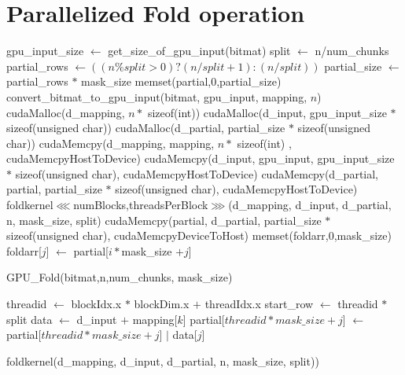 \documentclass{article}
\begin{document}
\section*{Parallelized Fold operation}
\begin{algorithm}[H]
      \begin{algorithmic}[1]
      \STATE gpu\_input\_size $\gets$ get\_size\_of\_gpu\_input(bitmat)
      \STATE split $\gets$ n/num\_chunks
      \STATE partial\_rows $\gets ((n\%split > 0) ? (n/split + 1) : (n/split))$
      \STATE partial\_size $\gets$ partial\_rows $*$ mask\_size
      \STATE memset(partial,$0$,partial\_size)
      \STATE convert\_bitmat\_to\_gpu\_input(bitmat, gpu\_input, mapping, $n$)
      \STATE cudaMalloc(d\_mapping, $n *$ sizeof(int))
      \STATE cudaMalloc(d\_input, gpu\_input\_size $*$ sizeof(unsigned char))
      \STATE cudaMalloc(d\_partial, partial\_size $*$ sizeof(unsigned char))
      \STATE cudaMemcpy(d\_mapping, mapping, $n *$ sizeof(int) , cudaMemcpyHostToDevice)
      \STATE cudaMemcpy(d\_input, gpu\_input, gpu\_input\_size $*$ sizeof(unsigned char), cudaMemcpyHostToDevice)
      \STATE cudaMemcpy(d\_partial, partial, partial\_size $*$ sizeof(unsigned char), cudaMemcpyHostToDevice)
      \STATE foldkernel$\lll$numBlocks,threadsPerBlock$\ggg$(d\_mapping, d\_input, d\_partial, n, mask\_size, split)
      \STATE cudaMemcpy(partial, d\_partial, partial\_size $*$ sizeof(unsigned char), cudaMemcpyDeviceToHost)
      \STATE memset(foldarr,0,mask\_size)
                \STATE foldarr[$j$] $\gets$ partial[$i*$mask\_size $+j$]
            \ENDFOR
      \ENDFOR
      \end{algorithmic}
      \caption{GPU\_Fold(bitmat,n,num\_chunks, mask\_size)}
\end{algorithm}

\begin{algorithm}[H]
      \begin{algorithmic}[1]
      \STATE threadid $\gets$ blockIdx.x $*$ blockDim.x $+$ threadIdx.x
      \STATE start\_row $\gets$ threadid $*$ split
                \STATE data $\gets$ d\_input $+$ mapping[$k$]
                    \STATE partial[$threadid * mask\_size + j$] $\gets $ partial[$threadid * mask\_size + j$] $\mathrel{|}$ data[$j$]
                \ENDFOR
            \ENDIF
      \ENDFOR
      \end{algorithmic}
      \caption{foldkernel(d\_mapping, d\_input, d\_partial, n, mask\_size, split))}
\end{algorithm}
\end{document}
